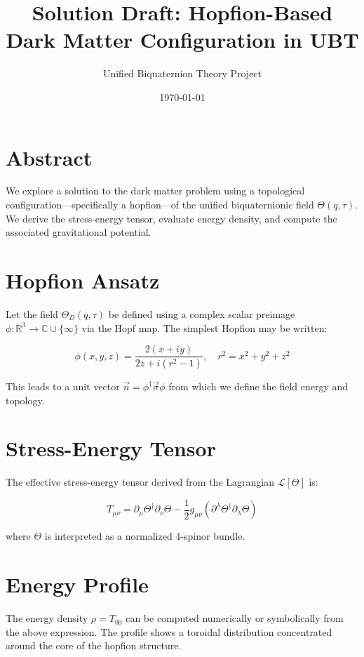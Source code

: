 \documentclass[12pt]{article}
\title{Solution Draft: Hopfion-Based Dark Matter Configuration in UBT}
\author{Unified Biquaternion Theory Project}
\date{\today}
\begin{document}
\maketitle

\section*{Abstract}
We explore a solution to the dark matter problem using a topological configuration—specifically a hopfion—of the unified biquaternionic field \( \Theta(q, \tau) \). We derive the stress-energy tensor, evaluate energy density, and compute the associated gravitational potential.

\section{Hopfion Ansatz}
Let the field \( \Theta_D(q, \tau) \) be defined using a complex scalar preimage \( \phi: \mathbb{R}^3 \to \mathbb{C} \cup \{\infty\} \) via the Hopf map. The simplest Hopfion may be written:

\[
\phi(x,y,z) = \frac{2(x + i y)}{2z + i(r^2 - 1)}, \quad r^2 = x^2 + y^2 + z^2
\]

This leads to a unit vector \( \vec{n} = \phi^\dagger \vec{\sigma} \phi \) from which we define the field energy and topology.

\section{Stress-Energy Tensor}
The effective stress-energy tensor derived from the Lagrangian \( \mathcal{L}[\Theta] \) is:

\[
T_{\mu\nu} = \partial_\mu \Theta^\dagger \partial_\nu \Theta - \frac{1}{2} g_{\mu\nu} \left( \partial^\lambda \Theta^\dagger \partial_\lambda \Theta \right)
\]

where \( \Theta \) is interpreted as a normalized 4-spinor bundle.

\section{Energy Profile}
The energy density \( \rho = T_{00} \) can be computed numerically or symbolically from the above expression. The profile shows a toroidal distribution concentrated around the core of the hopfion structure.
\end{document}
